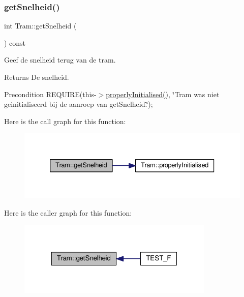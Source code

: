 \subsubsection{\texorpdfstring{get\+Snelheid()}{getSnelheid()}}
{\footnotesize\ttfamily int Tram\+::get\+Snelheid (\begin{DoxyParamCaption}{ }\end{DoxyParamCaption}) const}



Geef de snelheid terug van de tram. 

\begin{DoxyReturn}{Returns}
De snelheid. 
\end{DoxyReturn}
\begin{DoxyPrecond}{Precondition}
R\+E\+Q\+U\+I\+RE(this-\/$>$\hyperlink{class_tram_ac2688f590e4db232b4f535c9bf959efb}{properly\+Initialised()}, \char`\"{}\+Tram was niet geinitialiseerd bij de aanroep van get\+Snelheid.\char`\"{}); 
\end{DoxyPrecond}
Here is the call graph for this function\+:\nopagebreak
\begin{figure}[H]
\begin{center}
\leavevmode
\includegraphics[width=333pt]{class_tram_aa8bcd980469801cb8524f170006f666c_cgraph}
\end{center}
\end{figure}
Here is the caller graph for this function\+:\nopagebreak
\begin{figure}[H]
\begin{center}
\leavevmode
\includegraphics[width=265pt]{class_tram_aa8bcd980469801cb8524f170006f666c_icgraph}
\end{center}
\end{figure}
\mbox{\label{class_tram_a46c37aab218c334dac8b5340647f53ab}} 
